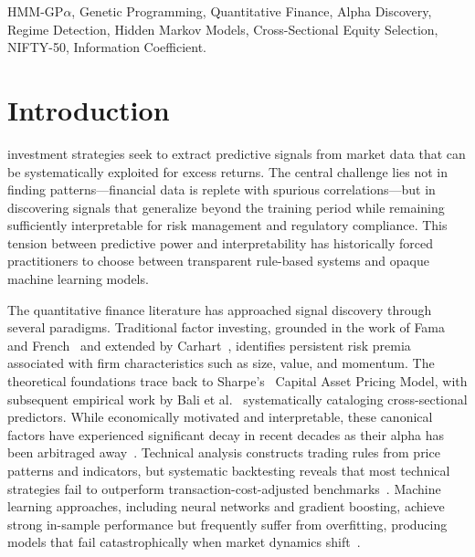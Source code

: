 \documentclass{ieeeaccess}
\begin{document}
\begin{keywords}
HMM-GP$\alpha$, Genetic Programming, Quantitative Finance, Alpha Discovery, Regime Detection, Hidden Markov Models, Cross-Sectional Equity Selection, NIFTY-50, Information Coefficient.
\end{keywords}

\titlepgskip=-21pt

\maketitle

\section{Introduction}
\label{sec:introduction}
 investment strategies seek to extract predictive signals from market data that can be systematically exploited for excess returns. The central challenge lies not in finding patterns---financial data is replete with spurious correlations---but in discovering signals that generalize beyond the training period while remaining sufficiently interpretable for risk management and regulatory compliance. This tension between predictive power and interpretability has historically forced practitioners to choose between transparent rule-based systems and opaque machine learning models.

The quantitative finance literature has approached signal discovery through several paradigms. Traditional factor investing, grounded in the work of Fama and French~\cite{b1} and extended by Carhart~\cite{b2}, identifies persistent risk premia associated with firm characteristics such as size, value, and momentum. The theoretical foundations trace back to Sharpe's~\cite{b28} Capital Asset Pricing Model, with subsequent empirical work by Bali et al.~\cite{b23} systematically cataloging cross-sectional predictors. While economically motivated and interpretable, these canonical factors have experienced significant decay in recent decades as their alpha has been arbitraged away~\cite{b3}. Technical analysis constructs trading rules from price patterns and indicators, but systematic backtesting reveals that most technical strategies fail to outperform transaction-cost-adjusted benchmarks~\cite{b4}. Machine learning approaches, including neural networks and gradient boosting, achieve strong in-sample performance but frequently suffer from overfitting, producing models that fail catastrophically when market dynamics shift~\cite{b5}.
\end{document}
